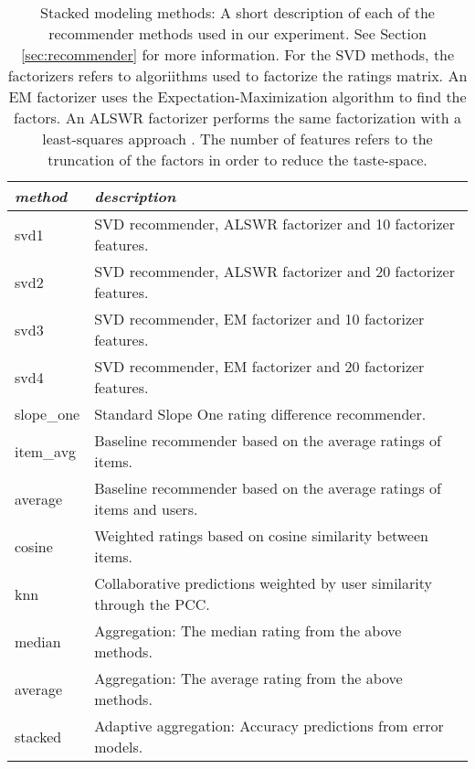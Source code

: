 \begin{table}[t]
  \begin{tabular*}{\textwidth}{ l l }
    \toprule
    \emph{method} & \emph{description} \\
    \midrule
    svd1          & SVD recommender, ALSWR factorizer and 10 factorizer features. \\
    svd2          & SVD recommender, ALSWR factorizer and 20 factorizer features. \\
    svd3          & SVD recommender, EM factorizer and 10 factorizer features. \\
    svd4          & SVD recommender, EM factorizer and 20 factorizer features. \\
    slope\_one    & Standard Slope One rating difference recommender. \\
    item\_avg     & Baseline recommender based on the average ratings of items. \\
    average       & Baseline recommender based on the average ratings of items and users. \\
    cosine   	    & Weighted ratings based on cosine similarity between items. \\
    knn       	  & Collaborative predictions weighted by user similarity through the PCC. \\
    \midrule
    median    	  & Aggregation: The median rating from the above methods. \\
    average    	  & Aggregation: The average rating from the above methods. \\
    stacked       & Adaptive aggregation: Accuracy predictions from error models. \\
    \bottomrule
  \end{tabular*}
  \caption[Stacked Modeling Methods]{
    Stacked modeling methods: A short description of each of the recommender methods
    used in our experiment. See Section \ref{sec:recommender} for more information.
    For the SVD methods, the factorizers refers to algoriithms used to factorize the ratings matrix.
    An EM factorizer uses the Expectation-Maximization algorithm to find the factors.
    An ALSWR factorizer performs the same factorization with a least-squares approach \citep{Zhou2008}.
    The number of features refers to the truncation of the factors in order to reduce the taste-space.
  }
    
  \label{table:results:methods}
\end{table}



